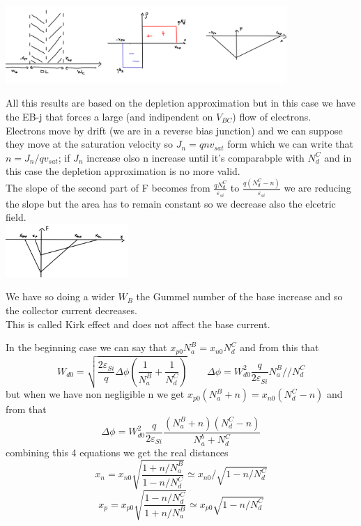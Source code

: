 \centering
\includegraphics[width=0.8\textwidth]{bjt9.png}\\
\raggedright

All this results are based on the depletion approximation but in this case we have the EB-j that forces a large (and indipendent on $V_{BC}$) flow of electrons.\\
Electrons move by drift (we are in a reverse bias junction) and we can suppose they move at the saturation velocity so $J_n=qnv_{sat}$ form which we can write that $n=J_n/qv_{sat}$; if $J_n$ increase olso n increase until it's comparabple with $N_d^C$ and in this case the depletion approximation is no more valid.\\
The slope of the second part of F becomes from $\frac{qN_d^C}{\varepsilon_{si}}$ to $\frac{q(N_d^C-n)}{\varepsilon_{si}}$ we are reducing the slope but the area has to remain constant so we decrease also the elcetric field.\\

\centering
\includegraphics[width=0.35\textwidth]{bjt10.png}\\
\raggedright

We have so doing a wider $W_B$ the Gummel number of the base increase and so the collector current decreases.\\
This is called Kirk effect and does not affect the base current.\\
\vspace{5mm}

In the beginning case we can say that $x_{p0}N_a^B=x_{n0}N_d^C$ and from this that 
\begin{equation}
W_{d0}=\sqrt{\frac{2\varepsilon_{Si}}{q}\Delta\phi(\frac{1}{N_a^B}+\frac{1}{N_d^C})} \ \ \ \ \ \ \ \ \ \Delta \phi=W_{d0}^2 \frac{q}{2\varepsilon_{Si}} N_a^B//N_d^C
\end{equation}
but when we have non negligible n we get $x_{p0}(N_a^B+n)=x_{n0}(N_d^C-n)$ and from that 
\begin{equation}
\Delta \phi=W_{d0}^2 \frac{q}{2\varepsilon_{Si}}\frac{(N_a^B+n)(N_d^C-n)}{N_a^b+N_d^C}
\end{equation}
combining this 4 equations we get the real distances 
\begin{equation}
x_n=x_{n0}\sqrt{\frac{1+n/N_a^B}{1-n/N_d^C}}\simeq x_{n0}/\sqrt{1-n/N_d^C}
\end{equation}
\begin{equation}
x_p=x_{p0}\sqrt{\frac{1-n/N_d^C}{1+n/N_a^B}}\simeq x_{p0}\sqrt{1-n/N_d^C}
\end{equation}

